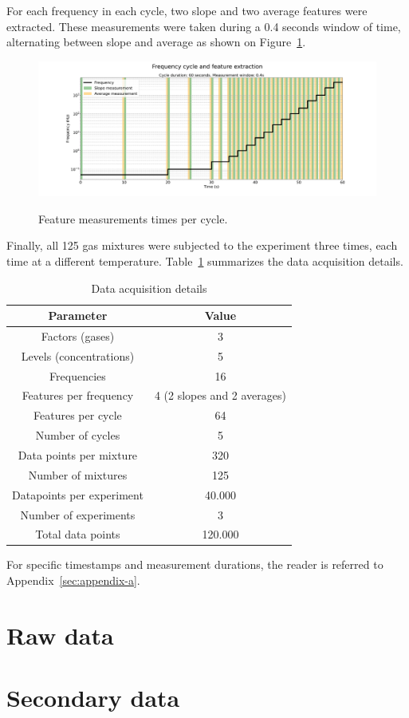 For each frequency in each cycle, two slope and two average features were extracted. These measurements were taken during a 0.4 seconds window of time, alternating between slope and average as shown on Figure~\ref{fig:feat-window}. 

\begin{figure}[!htb]
	\centering
	\includegraphics[width=1\textwidth]{../figures/measurement-windows.png}
	\label{fig:feat-window}
	\caption{Feature measurements times per cycle.}
\end{figure} 

Finally, all 125 gas mixtures were subjected to the experiment three times, each time at a different temperature. Table~\ref{tab:measurements} summarizes the data acquisition details.

\begin{table}[h]
	\centering
	\caption{Data acquisition details}
	\label{tab:measurements}
	\begin{tabular}{|c|c|}
		\hline
		\textbf{Parameter} & \textbf{Value} \\
		\hline
		Factors (gases) & 3 \\
		\hline
		Levels (concentrations) & 5 \\
		\hline
		Frequencies & 16 \\
		\hline
		Features per frequency & 4 (2 slopes and 2 averages) \\
		\hline
		Features per cycle & 64 \\
		\hline
		Number of cycles & 5 \\
		\hline
		Data points per mixture & 320 \\
		\hline
		Number of mixtures & 125 \\
		\hline
		Datapoints per experiment & 40.000 \\
		\hline
		Number of experiments & 3 \\
		\hline
		Total data points & 120.000 \\
		\hline
	\end{tabular}
\end{table}

For specific timestamps and measurement durations, the reader is referred to Appendix~\ref{sec:appendix-a}.

\section{Raw data}
\label{sec:raw-data}

\section{Secondary data}
\label{sec:secondary-data}
